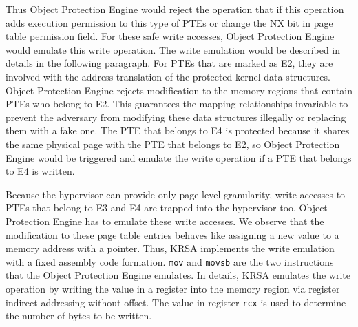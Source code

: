 \documentclass[conference]{IEEEtran}
\begin{document}
Thus Object Protection Engine would reject the operation that if this operation adds execution permission to this type of PTEs or change the NX bit in page table permission field. For these safe write accesses, Object Protection Engine would emulate this write operation. The write emulation would be described in details in the following paragraph. 
For PTEs that are marked as E2, they are involved with the address translation of the protected kernel data structures. Object Protection Engine rejects modification to the memory regions that contain PTEs who belong to E2. This guarantees the mapping relationships invariable to prevent the adversary from modifying these data structures illegally or replacing them with a fake one.
The PTE that belongs to E4 is protected because it shares the same physical page with the PTE that belongs to E2, so Object Protection Engine would be triggered and emulate the write operation if a PTE that belongs to E4 is written. 

Because the hypervisor can provide only page-level granularity, write accesses to PTEs that belong to E3 and E4 are trapped into the hypervisor too, Object Protection Engine has to emulate these write accesses. We observe that the modification to these page table entries behaves like assigning a new value to a memory address with a pointer. Thus, KRSA implements the write emulation with a fixed assembly code formation. \verb|mov| and \verb|movsb| are the two instructions that the Object Protection Engine emulates. In details, KRSA emulates the write operation by writing the value in a register into the memory region via register indirect addressing without offset. The value in register \verb|rcx| is used to determine the number of bytes to be written. 
\end{document}
